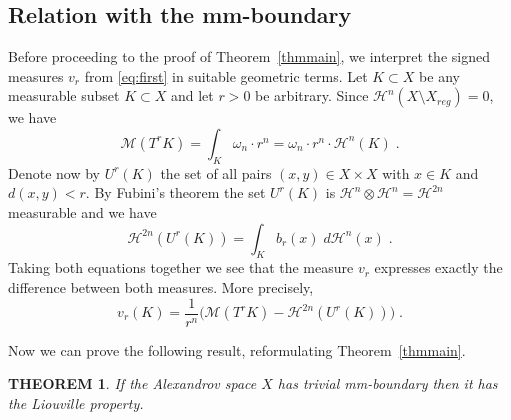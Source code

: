 \documentclass[12pt,leqno]{amsart}
\numberwithin{equation}{section}
\newtheorem{thm}{THEOREM}[section]
\theoremstyle{definition}
\theoremstyle{remark}
\newcommand{\tref}[1]{Theorem~\ref{#1}}
\begin{document}
\subsection{Relation with the mm-boundary}
Before proceeding to the proof of  \tref{thmmain}, we interpret the signed measures $v_r$ from \eqref{eq:first} in suitable geometric terms.
Let $K\subset X$ be   any measurable  subset $K\subset X$ and let $r>0$ be arbitrary.
Since $\mathcal H^n (X\setminus X_{reg} )=0$, we have
$$\mathcal M (T^r K) =\int _K \omega _n \cdot r^n  =\omega _n \cdot r^n \cdot \mathcal H^n (K) \; .$$
Denote now by $U^r(K)$ the set of all pairs $(x,y)\in X\times X$ with $x\in K$ and $d(x,y)<r$.
By Fubini's theorem the set $U^r(K)$ is $\mathcal H^n \otimes \mathcal H^n =\mathcal H^{2n}$ measurable and we have
$$\mathcal H^{2n} (U^r (K))= \int _K b_r (x) \;  d\mathcal H^n (x) \;. $$
Taking both equations  together we see that the measure $v_r$ expresses exactly the difference between both measures. More precisely,
\begin{equation} \label{eq:compare}
v_r (K) = \frac 1 {r^n} \Big(\mathcal M (T^r K)- \mathcal H^{2n} (U^r (K)) \Big)\;.
\end{equation}



Now we can prove the following result,  reformulating \tref{thmmain}.
\begin{thm} \label{reform}
If the Alexandrov space $X$ has trivial mm-boundary then  it has the Liouville property.
\end{thm}
\end{document}
